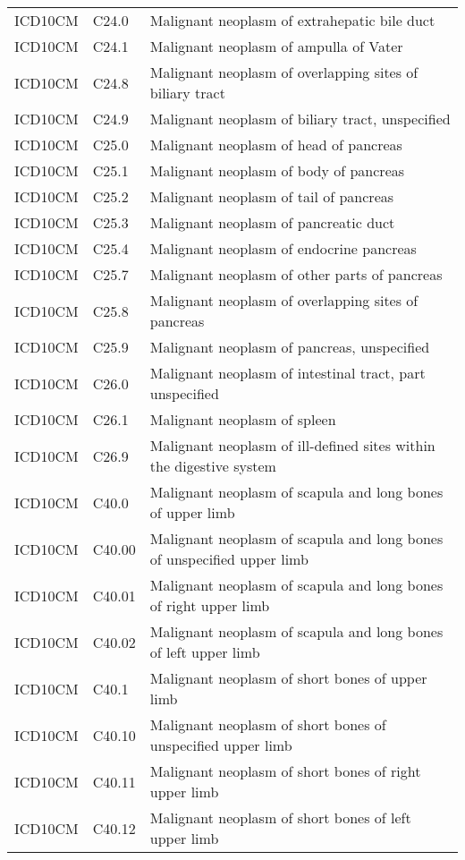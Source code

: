 \begin{longtable}{p{}p{}p{}}
  ICD10CM & C24.0 & Malignant neoplasm of extrahepatic bile duct \\ 
  ICD10CM & C24.1 & Malignant neoplasm of ampulla of Vater \\ 
  ICD10CM & C24.8 & Malignant neoplasm of overlapping sites of biliary tract \\ 
  ICD10CM & C24.9 & Malignant neoplasm of biliary tract, unspecified \\ 
  ICD10CM & C25.0 & Malignant neoplasm of head of pancreas \\ 
  ICD10CM & C25.1 & Malignant neoplasm of body of pancreas \\ 
  ICD10CM & C25.2 & Malignant neoplasm of tail of pancreas \\ 
  ICD10CM & C25.3 & Malignant neoplasm of pancreatic duct \\ 
  ICD10CM & C25.4 & Malignant neoplasm of endocrine pancreas \\ 
  ICD10CM & C25.7 & Malignant neoplasm of other parts of pancreas \\ 
  ICD10CM & C25.8 & Malignant neoplasm of overlapping sites of pancreas \\ 
  ICD10CM & C25.9 & Malignant neoplasm of pancreas, unspecified \\ 
  ICD10CM & C26.0 & Malignant neoplasm of intestinal tract, part unspecified \\ 
  ICD10CM & C26.1 & Malignant neoplasm of spleen \\ 
  ICD10CM & C26.9 & Malignant neoplasm of ill-defined sites within the digestive system \\ 
  ICD10CM & C40.0 & Malignant neoplasm of scapula and long bones of upper limb \\ 
  ICD10CM & C40.00 & Malignant neoplasm of scapula and long bones of unspecified upper limb \\ 
  ICD10CM & C40.01 & Malignant neoplasm of scapula and long bones of right upper limb \\ 
  ICD10CM & C40.02 & Malignant neoplasm of scapula and long bones of left upper limb \\ 
  ICD10CM & C40.1 & Malignant neoplasm of short bones of upper limb \\ 
  ICD10CM & C40.10 & Malignant neoplasm of short bones of unspecified upper limb \\ 
  ICD10CM & C40.11 & Malignant neoplasm of short bones of right upper limb \\ 
  ICD10CM & C40.12 & Malignant neoplasm of short bones of left upper limb \\ 

\end{longtable}
